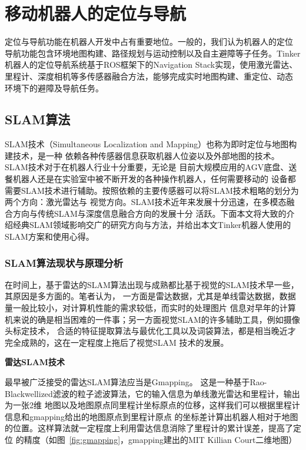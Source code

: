\chapter{移动机器人的定位与导航}
\label{cha:nav}

定位与导航功能在机器人开发中占有重要地位。一般的，我们认为机器人的定位
导航功能包含环境地图构建、路径规划与运动控制以及自主避障等子任务。Tinker
机器人的定位导航系统基于ROS框架下的Navigation Stack实现，使用激光雷达、
里程计、深度相机等多传感器融合方法，能够完成实时地图构建、重定位、动态
环境下的避障及导航任务。


\section{SLAM算法}

SLAM技术（Simultaneous Localization and Mapping）也称为即时定位与地图构建技术，是一种
依赖各种传感器信息获取机器人位姿以及外部地图的技术。SLAM技术对于在机器人行业十分重要，无论是
目前大规模应用的AGV底盘、送餐机器人还是在实验室中被不断开发的各种操作机器人，任何需要移动的
设备都需要SLAM技术进行辅助。按照依赖的主要传感器可以将SLAM技术粗略的划分为两个方向：激光雷达与
视觉方向。SLAM技术近年来发展十分迅速，在多模态融合方向与传统SLAM与深度信息融合方向的发展十分
活跃。下面本文将大致的介绍经典SLAM领域影响交广的研究方向与方法，并给出本文Tinker机器人使用的
SLAM方案和使用心得。

\subsection{SLAM算法现状与原理分析}

在时间上，基于雷达的SLAM算法出现与成熟都比基于视觉的SLAM技术早一些，其原因是多方面的。笔者认为，
一方面是雷达数据，尤其是单线雷达数据，数据量一般比较小，对计算机性能的需求较低，而实时的处理图片
信息对早年的计算机来说的确是相当困难的一件事；另一方面视觉SLAM的许多辅助工具，例如摄像头标定技术，
合适的特征提取算法与最优化工具以及词袋算法，都是相当晚近才完全成熟的，这在一定程度上拖后了视觉SLAM
技术的发展。

\noindent \textbf{雷达SLAM技术}

最早被广泛接受的雷达SLAM算法应当是Gmapping\cite{grisettiyz2005improving, grisetti2007improved}。
这是一种基于Rao-Blackwellized滤波的粒子滤波算法，它的输入信息为单线激光雷达和里程计，输出为一张2维
地图以及地图原点同里程计坐标原点的位移，这样我们可以根据里程计信息和gmapping给出的地图原点到里程计原点
的坐标差计算出机器人相对于地图的位置。这样算法就一定程度上利用雷达信息消除了里程计的累计误差，提高了定位
的精度（如图~\ref{fig:gmapping}，gmapping建出的MIT Killian Court二维地图）


